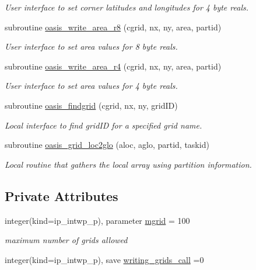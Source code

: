 \begin{DoxyCompactItemize}
\begin{DoxyCompactList}\small\item\em User interface to set corner latitudes and longitudes for 4 byte reals. \end{DoxyCompactList}\item 
subroutine \hyperlink{classmod__oasis__grid_ae54eaec7b4e9d4877af0ce8537b0b256}{oasis\+\_\+write\+\_\+area\+\_\+r8} (cgrid, nx, ny, area, partid)
\begin{DoxyCompactList}\small\item\em User interface to set area values for 8 byte reals. \end{DoxyCompactList}\item 
subroutine \hyperlink{classmod__oasis__grid_ad1d3e95cf63a2277b82167ec6c8148d4}{oasis\+\_\+write\+\_\+area\+\_\+r4} (cgrid, nx, ny, area, partid)
\begin{DoxyCompactList}\small\item\em User interface to set area values for 4 byte reals. \end{DoxyCompactList}\item 
subroutine \hyperlink{classmod__oasis__grid_aa1b2c3dc81299472185c1e7142d143e0}{oasis\+\_\+findgrid} (cgrid, nx, ny, grid\+I\+D)
\begin{DoxyCompactList}\small\item\em Local interface to find grid\+I\+D for a specified grid name. \end{DoxyCompactList}\item 
subroutine \hyperlink{classmod__oasis__grid_a5aba1fce549be5f9db2fda5374d588e1}{oasis\+\_\+grid\+\_\+loc2glo} (aloc, aglo, partid, taskid)
\begin{DoxyCompactList}\small\item\em Local routine that gathers the local array using partition information. \end{DoxyCompactList}\end{DoxyCompactItemize}
\subsection*{Private Attributes}
\begin{DoxyCompactItemize}
\item 
integer(kind=ip\+\_\+intwp\+\_\+p), parameter \hyperlink{classmod__oasis__grid_a9df267c5d7acbb73eb35d6aaf10ab59e}{mgrid} = 100
\begin{DoxyCompactList}\small\item\em maximum number of grids allowed \end{DoxyCompactList}\item 
integer(kind=ip\+\_\+intwp\+\_\+p), save \hyperlink{classmod__oasis__grid_a587c160986cc015e4367b1cca13babfb}{writing\+\_\+grids\+\_\+call} =0
\end{DoxyCompactItemize}


